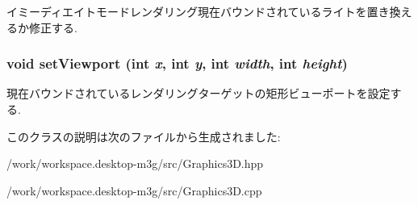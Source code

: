 イミーディエイトモードレンダリング現在バウンドされているライトを置き換えるか修正する. \hypertarget{classm3g_1_1Graphics3D_0b4ec48e9c19060e9be5648c118c23b1}{
\subsubsection[{setViewport}]{\setlength{\rightskip}{0pt plus 5cm}void setViewport (int {\em x}, \/  int {\em y}, \/  int {\em width}, \/  int {\em height})}}
\label{classm3g_1_1Graphics3D_0b4ec48e9c19060e9be5648c118c23b1}


現在バウンドされているレンダリングターゲットの矩形ビューポートを設定する. 

このクラスの説明は次のファイルから生成されました:\begin{CompactItemize}
\item 
/work/workspace.desktop-m3g/src/Graphics3D.hpp\item 
/work/workspace.desktop-m3g/src/Graphics3D.cpp\end{CompactItemize}
